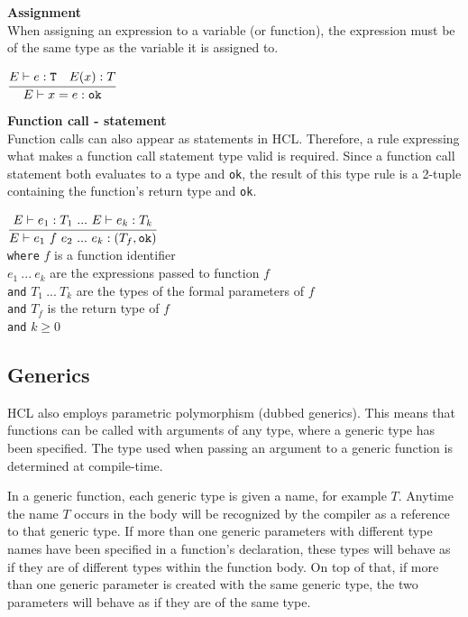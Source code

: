 \textbf{Assignment}\\
When assigning an expression to a variable (or function), the expression must be of the same type as the variable it is assigned to.

\begin{center}
	\begin{math}
	\cfrac
	{E\vdash e : \texttt{T}\quad E(x) : T}
	{E \vdash x = e : \texttt{ok}}
	\end{math}
\end{center}

\textbf{Function call - statement}\\
Function calls can also appear as statements in HCL.
Therefore, a rule expressing what makes a function call statement type valid is required.
Since a function call statement both evaluates to a type and \texttt{ok}, the result of this type rule is a 2-tuple containing the function's return type and \texttt{ok}.

\begin{center}
	\begin{math}
	\cfrac
	{E \vdash e_1 : T_1 \ .
		.
		.
		\ E \vdash e_k : T_k}
	{E \vdash e_1\ f\ e_2 \ .
		.
		.
		\ e_k : (T_f, \texttt{ok})}
	\end{math}
	\\[1\baselineskip]
	\texttt{where} $f$ is a function identifier\\
	$e_1\ .
	.
	.
	\ e_k$ are the expressions passed to function $f$\\
	\texttt{and} $T_1\ .
	.
	.
	\ T_k$ are the types of the formal parameters of $f$\\
	\texttt{and} $T_f$ is the return type of $f$\\
	\texttt{and} $k \ge 0$
\end{center}

\subsection{Generics}
HCL also employs parametric polymorphism (dubbed generics).
This means that functions can be called with arguments of any type, where a generic type has been specified.
The type used when passing an argument to a generic function is determined at compile-time.

In a generic function, each generic type is given a name, for example $T$.
Anytime the name $T$ occurs in the body will be recognized by the compiler as a reference to that generic type.
If more than one generic parameters with different type names have been specified in a function's declaration, these types will behave as if they are of different types within the function body.
On top of that, if more than one generic parameter is created with the same generic type, the two parameters will behave as if they are of the same type.

